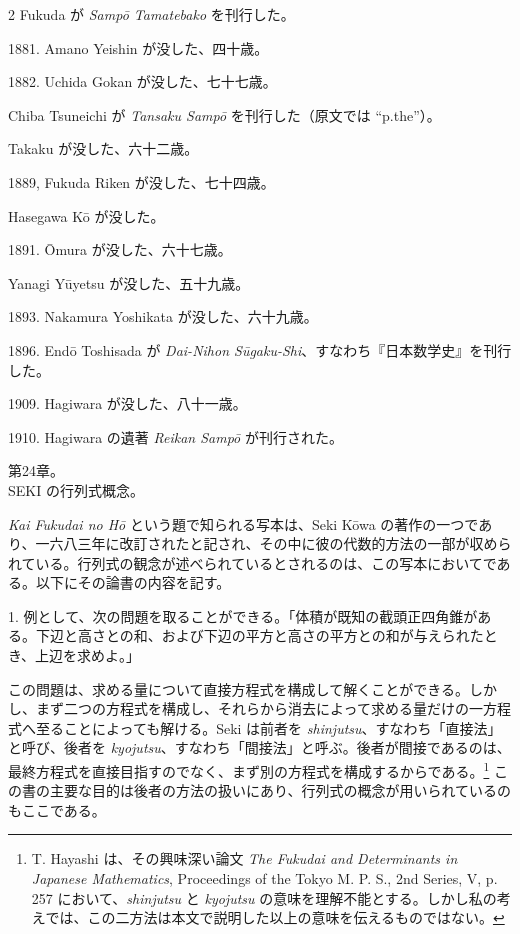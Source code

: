 \documentclass[11pt]{article}
\newcommand{\scanpage}[2]{\clearpage\setcounter{footnote}{0}\noindent{\footnotesize\color{gray}PDF #1 頁 · #2}\par\medskip}
\newcommand{\scanfooter}{}
\begin{document}
\begin{multicols}{2}
Fukuda が \emph{Sampō Tamatebako} を刊行した。

1881. Amano Yeishin が没した、四十歳。

1882. Uchida Gokan が没した、七十七歳。

Chiba Tsuneichi が \emph{Tansaku Sampō} を刊行した（原文では ``p.the''）。

Takaku が没した、六十二歳。

1889, Fukuda Riken が没した、七十四歳。

Hasegawa Kō が没した。

1891. Ōmura が没した、六十七歳。

Yanagi Yūyetsu が没した、五十九歳。

1893. Nakamura Yoshikata が没した、六十九歳。

1896. Endō Toshisada が \emph{Dai-Nihon Sūgaku-Shi}、すなわち『日本数学史』を刊行した。

1909. Hagiwara が没した、八十一歳。

1910. Hagiwara の遺著 \emph{Reikan Sampō} が刊行された。
\end{multicols}

\begin{center}
第24章。\\[1mm]
SEKI の行列式概念。
\end{center}

\emph{Kai Fukudai no Hō} という題で知られる写本は、Seki Kōwa の著作の一つであり、一六八三年に改訂されたと記され、その中に彼の代数的方法の一部が収められている。行列式の観念が述べられているとされるのは、この写本においてである。以下にその論書の内容を記す。

1. 例として、次の問題を取ることができる。「体積が既知の截頭正四角錐がある。下辺と高さとの和、および下辺の平方と高さの平方との和が与えられたとき、上辺を求めよ。」
\scanfooter

\scanpage{0206}{第24章、印刷頁192}
この問題は、求める量について直接方程式を構成して解くことができる。しかし、まず二つの方程式を構成し、それらから消去によって求める量だけの一方程式へ至ることによっても解ける。Seki は前者を \emph{shinjutsu}、すなわち「直接法」と呼び、後者を \emph{kyojutsu}、すなわち「間接法」と呼ぶ。後者が間接であるのは、最終方程式を直接目指すのでなく、まず別の方程式を構成するからである。\footnote{T. Hayashi は、その興味深い論文 \emph{The Fukudai and Determinants in Japanese Mathematics}, Proceedings of the Tokyo M. P. S., 2nd Series, V, p. 257 において、\emph{shinjutsu} と \emph{kyojutsu} の意味を理解不能とする。しかし私の考えでは、この二方法は本文で説明した以上の意味を伝えるものではない。} この書の主要な目的は後者の方法の扱いにあり、行列式の概念が用いられているのもここである。
\end{document}
